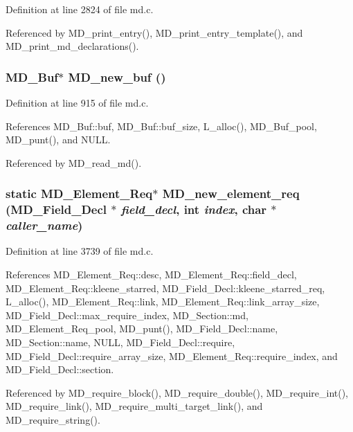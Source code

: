 Definition at line 2824 of file md.c.

Referenced by MD\_\-print\_\-entry(), MD\_\-print\_\-entry\_\-template(), and MD\_\-print\_\-md\_\-declarations().
\subsubsection{\setlength{\rightskip}{0pt plus 5cm}\bf{MD\_\-Buf}$\ast$ MD\_\-new\_\-buf ()}\label{md_8c_f03ec34f00616d99e40c4d01f39dad58}




Definition at line 915 of file md.c.

References MD\_\-Buf::buf, MD\_\-Buf::buf\_\-size, L\_\-alloc(), MD\_\-Buf\_\-pool, MD\_\-punt(), and NULL.

Referenced by MD\_\-read\_\-md().
\subsubsection{\setlength{\rightskip}{0pt plus 5cm}static \bf{MD\_\-Element\_\-Req}$\ast$ MD\_\-new\_\-element\_\-req (\bf{MD\_\-Field\_\-Decl} $\ast$ {\em field\_\-decl}, int {\em index}, char $\ast$ {\em caller\_\-name})\hspace{0.3cm}{\tt  [static]}}\label{md_8c_8a2a08b7dd9e77b9cde292144cc82c99}




Definition at line 3739 of file md.c.

References MD\_\-Element\_\-Req::desc, MD\_\-Element\_\-Req::field\_\-decl, MD\_\-Element\_\-Req::kleene\_\-starred, MD\_\-Field\_\-Decl::kleene\_\-starred\_\-req, L\_\-alloc(), MD\_\-Element\_\-Req::link, MD\_\-Element\_\-Req::link\_\-array\_\-size, MD\_\-Field\_\-Decl::max\_\-require\_\-index, MD\_\-Section::md, MD\_\-Element\_\-Req\_\-pool, MD\_\-punt(), MD\_\-Field\_\-Decl::name, MD\_\-Section::name, NULL, MD\_\-Field\_\-Decl::require, MD\_\-Field\_\-Decl::require\_\-array\_\-size, MD\_\-Element\_\-Req::require\_\-index, and MD\_\-Field\_\-Decl::section.

Referenced by MD\_\-require\_\-block(), MD\_\-require\_\-double(), MD\_\-require\_\-int(), MD\_\-require\_\-link(), MD\_\-require\_\-multi\_\-target\_\-link(), and MD\_\-require\_\-string().
